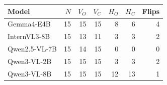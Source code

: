 \begin{tabular}{lrrrrrr}
\toprule
Model & $N$ & $V_O$ & $V_C$ & $H_O$ & $H_C$ & Flips \\
\midrule
Gemma4-E4B & 15 & 15 & 15 & 8 & 6 & 4 \\
InternVL3-8B & 15 & 13 & 11 & 3 & 3 & 2 \\
Qwen2.5-VL-7B & 15 & 14 & 15 & 0 & 0 & 0 \\
Qwen3-VL-2B & 15 & 15 & 15 & 3 & 3 & 2 \\
Qwen3-VL-8B & 15 & 15 & 15 & 12 & 13 & 1 \\
\bottomrule
\end{tabular}
